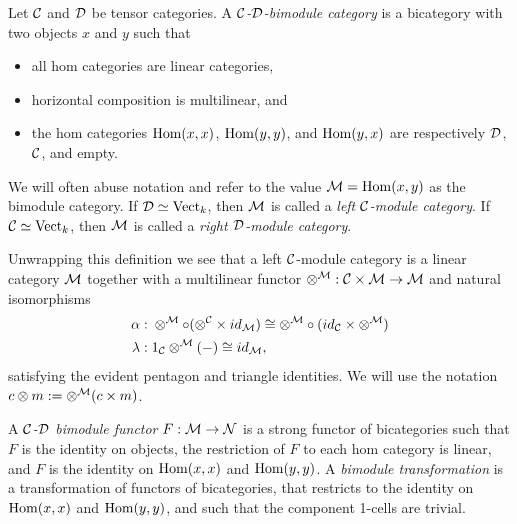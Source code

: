 \documentclass{amsart}
\begin{document}
\begin{definition}
	Let $\mathcal C$ and $\mathcal D$ be tensor categories. A {\em $\mathcal C$-$\mathcal D$-bimodule category} is a bicategory with two objects $x$ and $y$ such that
	\begin{itemize}
		\item all hom categories are linear categories, 
		\item horizontal composition is multilinear, and
		\item the hom categories $\operatorname{Hom}(x,x)$, $\operatorname{Hom}(y,y)$, and $\operatorname{Hom}(y,x)$ are respectively $\mathcal D$, $\mathcal C$, and empty.
	\end{itemize}
	We will often abuse notation and refer to the value $\mathcal M = \operatorname{Hom}(x,y)$ as the bimodule category. If $\mathcal D \simeq \mathrm{Vect}_k$, then $\mathcal M$ is called a {\em left $\mathcal C$-module category}. If $\mathcal C \simeq \mathrm{Vect}_k$, then $\mathcal M$ is called a {\em right $\mathcal D$-module category}.
\end{definition}
	
Unwrapping this definition we see that a left $\mathcal C$-module category is a linear category $\mathcal M$ together with a multilinear functor $\otimes^{\mathcal M}: \mathcal C \times \mathcal M \to \mathcal M$ and natural isomorphisms
	\begin{align*}
		\alpha: & \;    \otimes^{\mathcal M} \circ (\otimes^{\mathcal C} \times id_{\mathcal M}) \cong  \otimes^{\mathcal M} \circ (id_{\mathcal C} \times \otimes^{\mathcal M}) \\
		\lambda: & \; 1_{\mathcal C} \otimes^{\mathcal M}(-) \cong id_{\mathcal M},
	\end{align*}
	satisfying the evident pentagon and triangle identities.  We will use the notation $c \otimes m := \otimes^\mathcal M(c \times m)$.

\begin{definition}		
A {\em $\mathcal C$-$\mathcal D$ bimodule functor} $F:\mathcal M \to \mathcal N$ is a strong functor of bicategories such that 
		 $F$ is the identity on objects,
		  the restriction of $F$ to each hom category is linear,
		 and $F$ is the identity on $\operatorname{Hom}(x,x)$ and $\operatorname{Hom}(y,y)$.
	A {\em bimodule transformation} is a transformation of functors of bicategories, that restricts to the identity on $\operatorname{Hom}(x,x)$ and $\operatorname{Hom}(y,y)$, and such that the component 1-cells are trivial.  
\end{definition} %
	
\end{document}
